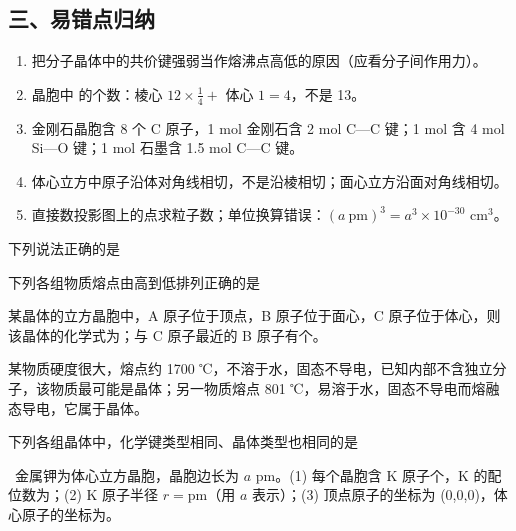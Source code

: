 \subsection*{三、易错点归纳}
\begin{enumerate}
\item 把分子晶体中的共价键强弱当作熔沸点高低的原因（应看分子间作用力）。
\item {} 晶胞中  的个数：棱心 $12\times\frac14+$ 体心 $1=4$，不是 13。
\item 金刚石晶胞含 8 个 C 原子，1 mol 金刚石含 2 mol C—C 键；1 mol  含 4 mol Si—O 键；1 mol 石墨含 1.5 mol C—C 键。
\item 体心立方中原子沿体对角线相切，不是沿棱相切；面心立方沿面对角线相切。
\item 直接数投影图上的点求粒子数；单位换算错误：$(a\ \mathrm{pm})^3=a^3\times10^{-30}$ cm$^3$。
\end{enumerate}

\begin{xiti}[start=1]
\item 下列说法正确的是\xz
{}

\item 下列各组物质熔点由高到低排列正确的是\xz
{}

\item 某晶体的立方晶胞中，A 原子位于顶点，B 原子位于面心，C 原子位于体心，则该晶体的化学式为\tk；与 C 原子最近的 B 原子有\tk{}个。

\item 某物质硬度很大，熔点约 1700 ℃，不溶于水，固态不导电，已知内部不含独立分子，该物质最可能是\tk{}晶体；另一物质熔点 801 ℃，易溶于水，固态不导电而熔融态导电，它属于\tk{}晶体。

\item 下列各组晶体中，化学键类型相同、晶体类型也相同的是\xz
{}

\item {}\ 金属钾为体心立方晶胞，晶胞边长为 $a$ pm。(1) 每个晶胞含 K 原子\tk{}个，K 的配位数为\tk；(2) K 原子半径 $r=$\tk pm（用 $a$ 表示）；(3) 顶点原子的坐标为 (0,0,0)，体心原子的坐标为\tk。
\end{xiti}

